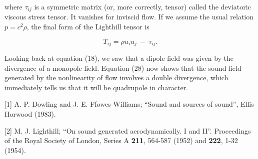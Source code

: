   where $\tau_{ij}$ is a symmetric matrix (or, more correctly, tensor) called 
  the deviatoric viscous stress tensor. It vanishes for inviscid flow. If we 
  assume the usual relation $p=c^2 \rho$, the final form of the Lighthill 
  tensor is 

  $$T_{ij} = \rho u_i u_j \mathrm{~}-\mathrm{~} \tau_{ij} . \tag{31}$$ 

  Looking back at equation (18), we saw that a dipole field was given by the 
  divergence of a monopole field. Equation (28) now shows that the sound field 
  generated by the nonlinearity of flow involves a double divergence, which 
  immediately tells us that it will be quadrupole in character. 

  \sectionreferences{}[1] A. P. Dowling and J. E. Ffowcs Williams; “Sound and 
  sources of sound”, Ellis Horwood (1983). 

  [2] M. J. Lighthill; “On sound generated aerodynamically. I and II”. 
  Proceedings of the Royal Society of London, Series A \textbf{211}, 564-587 
  (1952) and \textbf{222}, 1-32 (1954). 
